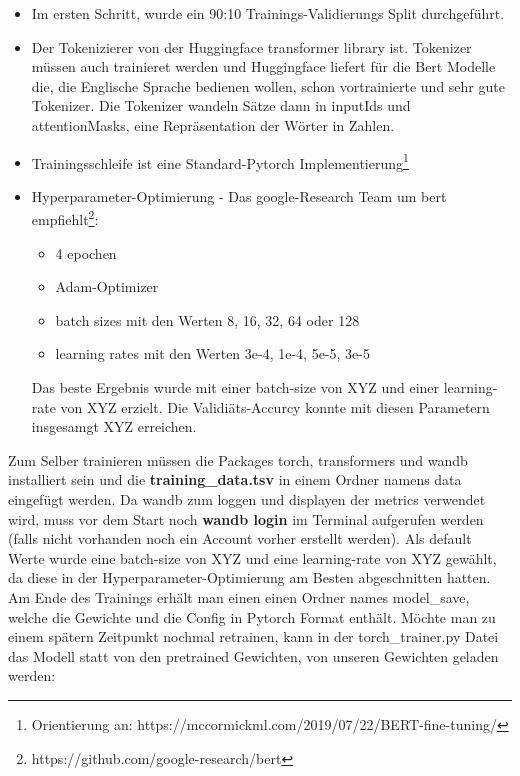 \documentclass[10pt,a4paper]{article}
\begin{document}
\begin{itemize}
	\item Im ersten Schritt, wurde ein 90:10 Trainings-Validierungs Split durchgeführt. 
		
	\item Der Tokenizierer von der Huggingface transformer library ist. Tokenizer müssen auch trainieret werden und Huggingface liefert für die Bert Modelle die, die Englische Sprache bedienen wollen, schon vortrainierte und sehr gute Tokenizer. Die Tokenizer wandeln Sätze dann in inputIds und attentionMasks, eine Repräsentation der Wörter in Zahlen.

	\item Trainingsschleife ist eine Standard-Pytorch Implementierung\footnote{Orientierung an: https://mccormickml.com/2019/07/22/BERT-fine-tuning/}

	\item Hyperparameter-Optimierung - Das google-Research Team um bert empfiehlt\footnote{https://github.com/google-research/bert}:
		\begin{itemize}
			\item 4 epochen
			\item Adam-Optimizer
			\item batch sizes mit den Werten 8, 16, 32, 64 oder 128
			\item learning rates mit den Werten 3e-4, 1e-4, 5e-5, 3e-5
		\end{itemize}
		Das beste Ergebnis wurde mit einer batch-size von XYZ und einer learning-rate von XYZ erzielt. Die Validiäts-Accurcy konnte mit diesen Parametern insgesamgt XYZ erreichen.
\end{itemize}

Zum Selber trainieren müssen die Packages torch, transformers und wandb installiert sein und die \textbf{training\_data.tsv} in einem Ordner namens data eingefügt werden. Da wandb zum loggen und displayen der metrics verwendet wird, muss vor dem Start noch \textbf{wandb login} im Terminal aufgerufen werden (falls nicht vorhanden noch ein Account vorher erstellt werden). Als default Werte wurde eine batch-size von XYZ und eine learning-rate von XYZ gewählt, da diese in der Hyperparameter-Optimierung am Besten abgeschnitten hatten. Am Ende des Trainings erhält man einen einen Ordner names model\_save, welche die Gewichte und die Config in Pytorch Format enthält. Möchte man zu einem spätern Zeitpunkt nochmal retrainen, kann in der torch\_trainer.py Datei das Modell statt von den pretrained Gewichten, von unseren Gewichten geladen werden:
\end{document}
